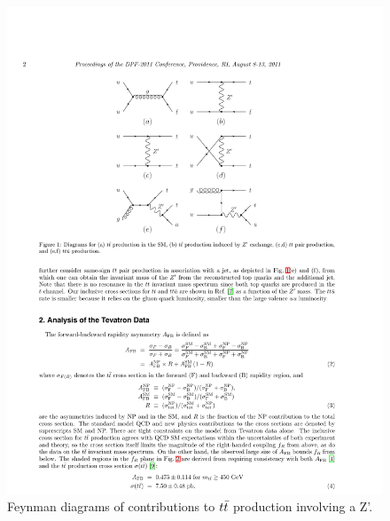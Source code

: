 \begin{figure}
  \begin{center}
    \includegraphics[width=125mm]{figures/theory/AsymmetryZPrimeModel}
  \end{center}
  \caption{Feynman diagrams of contributions to $t\bar{t}$ production involving a Z'.}
  \label{img:CDFAsymmetryMass}
\end{figure}


